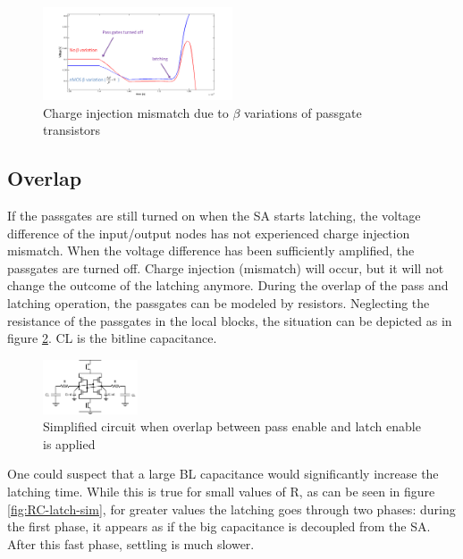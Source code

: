\documentclass[journal]{IEEEtran}
\begin{document}
\begin{figure}[ht!]
  \centering
  \includegraphics[width=0.5\textwidth]{../fig/hfdstk-sensamp-chargeinjectionmismatch.png}
  \caption{Charge injection mismatch due to $\beta$ variations of passgate transistors}
  \label{fig:chargeinjection}
\end{figure}

\subsection{Overlap}
If the passgates are still turned on when the SA starts latching, the voltage difference of the input/output nodes has not experienced charge injection mismatch. When the voltage difference has been sufficiently amplified, the passgates are turned off. Charge injection (mismatch) will occur, but it will not change the outcome of the latching anymore. During the overlap of the pass and latching operation, the passgates can be modeled by resistors. Neglecting the resistance of the passgates in the local blocks, the situation can be depicted as in figure \ref{fig:RC-latch}. CL is the bitline capacitance.

\begin{figure}[ht!]
  \centering
  \includegraphics[width=0.25\textwidth]{../fig/hfdstk-sensamp-RC-latch.png}
  \caption{Simplified circuit when overlap between pass enable and latch enable is applied}
  \label{fig:RC-latch}
\end{figure}

One could suspect that a large BL capacitance would significantly increase the latching time. While this is true for small values of R, as can be seen in figure \ref{fig:RC-latch-sim}, for greater values the latching goes through two phases: during the first phase, it appears as if the big capacitance is decoupled from the SA. After this fast phase, settling is much slower. 
\end{document}
